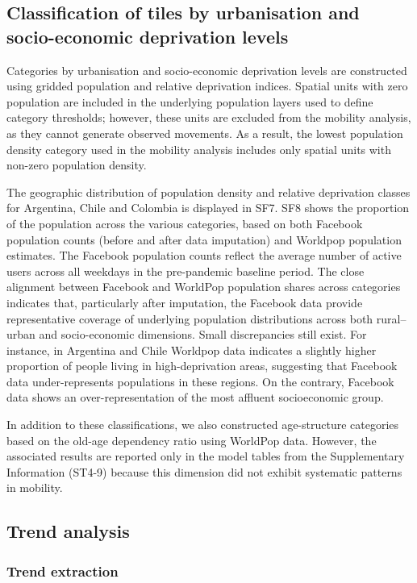 \documentclass[fleqn,10pt]{wlscirep}
\begin{document}
\subsection*{Classification of tiles by urbanisation and socio-economic deprivation levels}

Categories by urbanisation and socio-economic deprivation levels are constructed using gridded population and relative deprivation indices. Spatial units with zero population are included in the underlying population layers used to define category thresholds; however, these units are excluded from the mobility analysis, as they cannot generate observed movements. As a result, the lowest population density category used in the mobility analysis includes only spatial units with non-zero population density.

The geographic distribution of population density and relative deprivation classes for Argentina, Chile and Colombia is displayed in SF7. SF8 shows the proportion of the population across the various categories, based on both Facebook population counts (before and after data imputation) and Worldpop population estimates. The Facebook population counts reflect the average number of active users across all weekdays in the pre-pandemic baseline period. The close alignment between Facebook and WorldPop population shares across categories indicates that, particularly after imputation, the Facebook data provide representative coverage of underlying population distributions across both rural–urban and socio-economic dimensions. Small discrepancies still exist. For instance, in Argentina and Chile Worldpop data indicates a slightly higher proportion of people living in high-deprivation areas, suggesting that Facebook data under-represents populations in these regions. On the contrary, Facebook data shows an over-representation of the most affluent socioeconomic group. 

In addition to these classifications, we also constructed age-structure categories based on the old-age dependency ratio using WorldPop data. However, the associated results are reported only in the model tables from the Supplementary Information (ST4-9) because this dimension did not exhibit systematic patterns in mobility.

\subsection*{Trend analysis}

\subsubsection*{Trend extraction}
\end{document}
